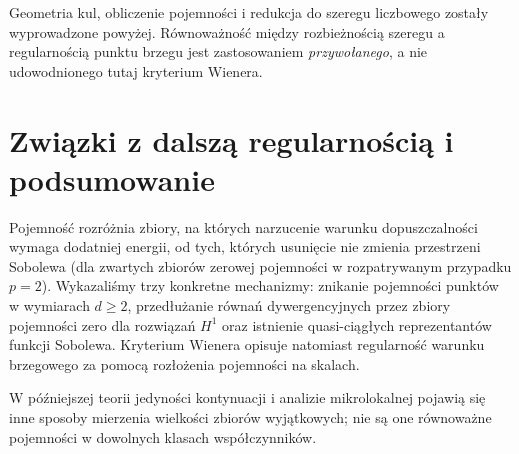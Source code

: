 \begin{uwaga}
Geometria kul, obliczenie pojemności i redukcja do szeregu
liczbowego zostały wyprowadzone powyżej. Równoważność
między rozbieżnością szeregu a regularnością punktu brzegu
jest zastosowaniem \emph{przywołanego}, a nie udowodnionego
tutaj kryterium Wienera.
\end{uwaga}

\section{Związki z dalszą regularnością i podsumowanie}
\label{sec:pde19-summary}
Pojemność rozróżnia zbiory, na których narzucenie
warunku dopuszczalności wymaga dodatniej energii,
od tych, których usunięcie nie zmienia przestrzeni
Sobolewa (dla zwartych zbiorów zerowej pojemności
w rozpatrywanym przypadku $p=2$). Wykazaliśmy
trzy konkretne mechanizmy: znikanie pojemności punktów
w wymiarach $d\ge2$, przedłużanie równań dywergencyjnych
przez zbiory pojemności zero dla rozwiązań $H^1$ oraz
istnienie quasi-ciągłych reprezentantów funkcji Sobolewa.
Kryterium Wienera opisuje natomiast regularność warunku
brzegowego za pomocą rozłożenia pojemności na skalach.

W późniejszej teorii jedyności kontynuacji i analizie
mikrolokalnej pojawią się inne sposoby mierzenia wielkości
zbiorów wyjątkowych; nie są one równoważne pojemności
w dowolnych klasach współczynników.


